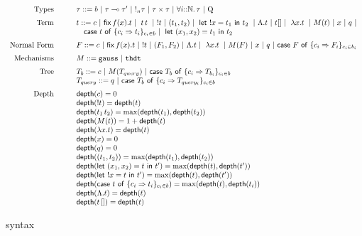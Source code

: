 \documentclass{article}
\begin{document}
 \begin{figure}[h]
 $$
 \begin{array}{rcl}
     \text{Types} & \quad & \tau ::= b \sep \tau \multimap \tau' \sep !_n \tau \sep
     \tau \times \tau \sep \tforallN{i}{\tau} \sep \query \\[2mm]

     \text{Term} & \quad & t ::= c \sep \fix{t} \sep \app{t}{t} \sep !t \sep (t_1,t_2) \sep  \letx{!x}{t_1}{t_2} \sep \Lambda.t \sep t[] \sep \abs{x}{t} \sep  M(t) \sep x \sep q \sep\\
     && \quad   \tcaseof{t}\ \{c_i \Rightarrow t_i\}_{c_i \in b}  \sep \letx{(x_1,x_2)}{t_1}{t_2} \\[2mm]
      
     \text{Normal Form} &\quad & F ::=  c \sep \fix{t} \sep !t \sep (F_1, F_2) \sep \Lambda. t \sep \abs{x}{t} \sep M(F) \sep x \sep q \sep \tcaseof{F}\ \{c_i \Rightarrow F_i\}_{c_i \in b_i}  \\[2mm]

     \text{Mechanisms} &\quad & M ::=  {\tt gauss} \sep {\tt thdt} \\[2mm]


	\text{Tree} &\quad& T_b :: = c \sep M(T_{query}) \sep \tcaseof{T_b}\ \{ c_i \Rightarrow T_{b_i}\}_{c_i \in b} \\

	\text{} &\quad& T_{query} :: = q \sep \tcaseof{T_b}\ \{ c_i \Rightarrow T_{query_i}\}_{c_i \in b} \\[2mm]
     \text{Depth} &\quad&   \depth(c) = 0 \\
       &\quad& \depth(!t) = \depth(t) \\
           &\quad&      \depth( \app{t_1}{t_2} ) = \max(\depth(t_1), \depth(t_2)) \\
            &\quad&  \depth(M(t)) = 1 + \depth(t) \\
             &\quad&  \depth(\abs{x}{t}) = \depth(t) \\
              &\quad& \depth(x) = 0 \\
              & \quad & \depth(q) = 0 \\
              & \quad & \depth((t_1, t_2)) = \max(\depth(t_1), \depth(t_2))\\
              & \quad & \depth(\letx{(x_1, x_2)}{t}{t'}) = \max(\depth(t), \depth(t'))\\
              & \quad & \depth(\letx{!x}{t}{t'}) = \max(\depth(t), \depth(t'))\\
              & \quad & \depth(\tcaseof{t}\ \{c_i \Rightarrow t_i\}_{c_i \in b}) = \max(\depth(t), \depth(t_i))\\
            & \quad & \depth(\Lambda.t) = \depth(t)\\
              & \quad & \depth(t\, []) = \depth(t)\\
\end{array}
$$
\caption{syntax}
\end{figure}
\end{document}

